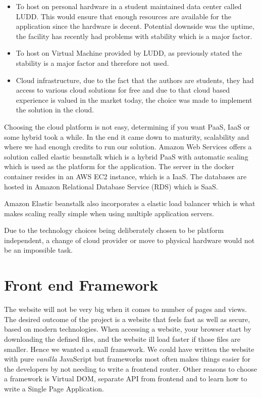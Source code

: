 \documentclass[12pt,a4paper]{report}
\begin{document}
\begin{itemize}
    \item To host on personal hardware in a student maintained data center called LUDD. This would ensure that enough resources are available for the application since the hardware is decent. Potential downside was the uptime, the facility has recently had problems with stability which is a major factor. 
    \item To host on Virtual Machine provided by LUDD, as previously stated the stability is a major factor and therefore not used.
    \item Cloud infrastructure, due to the fact that the authors are students, they had access to various cloud solutions for free and due to that cloud based experience is valued in the market today, the choice was made to implement the solution in the cloud.
\end{itemize}

Choosing the cloud platform is not easy, determining if you want PaaS, IaaS or some hybrid took a while. In the end it came down to maturity, scalability and where we had enough credits to run our solution. Amazon Web Services offers a solution called elastic beanstalk which is a hybrid PaaS with automatic scaling which is used as the platform for the application. The server in the docker container resides in an AWS EC2 instance, which is a IaaS. The databases are hosted in Amazon Relational Database Service (RDS) which is SaaS. 

Amazon Elastic beanstalk also incorporates a elastic load balancer which is what makes scaling really simple when using multiple application servers. 

Due to the technology choices being deliberately chosen to be platform independent, a change of cloud provider or move to physical hardware would not be an impossible task.
\section{Front end Framework}
The website will not be very big when it comes to number of pages and views.
The desired outcome of the project is a website that feels fast as well as secure, based on modern technologies. When accessing a website, your browser start by downloading the defined files, and the website ill load faster if those files are smaller. Hence we wanted a small framework.
We could have written the website with pure \textit{vanilla} JavaScript but frameworks most often makes things easier for the developers by not needing to write a frontend router. Other reasons to choose a framework is Virtual DOM, separate API from frontend and to learn how to write a Single Page Application.
\end{document}
